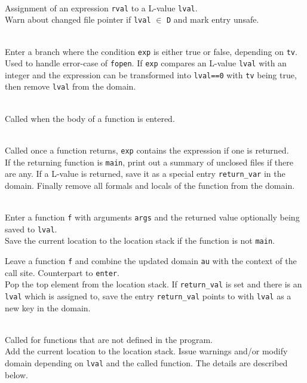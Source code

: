 \begin{description}
\item {}\\
Assignment of an expression \verb|rval| to a L-value \verb|lval|.\\
Warn about changed file pointer if \verb|lval| $\in$ \verb|D| and mark entry unsafe. %

\item {}\\
Enter a branch where the condition \verb|exp| is either true or false, depending on \verb|tv|.\\
Used to handle error-case of \verb|fopen|. If \verb|exp| compares an L-value \verb|lval| with an integer and the expression can be transformed into \verb|lval==0| with \verb|tv| being true, then remove \verb|lval| from the domain.

\item {}\\
Called when the body of a function is entered.

\item {}\\
Called once a function returns, \verb|exp| contains the expression if one is returned.\\
If the returning function is \verb|main|, print out a summary of unclosed files if there are any.
If a L-value is returned, save it as a special entry \verb|return_var| in the domain.
Finally remove all formals and locals of the function from the domain.

\item {}\\
Enter a function \verb|f| with arguments \verb|args| and the returned value optionally being saved to \verb|lval|.\\
Save the current location to the location stack if the function is not \verb|main|.

\item {}Leave a function \verb|f| and combine the updated domain \verb|au| with the context of the call site. Counterpart to \verb|enter|.\\
Pop the top element from the location stack. If \verb|return_val| is set and there is an \verb|lval| which is assigned to, save the entry \verb|return_val| points to with \verb|lval| as a new key in the domain.


\item {}\\
Called for functions that are not defined in the program.\\
Add the current location to the location stack. Issue warnings and/or modify domain depending on \verb|lval| and the called function. The details are described below.
\end{description}


